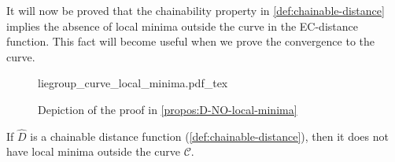 It will now be proved that the chainability property in \cref{def:chainable-distance} implies the absence of local minima outside the curve in the EC-distance function. This fact will become useful when we prove the convergence to the curve.
\begin{figure}[ht]
    \centering
    \def\svgwidth{.8\linewidth}
    {\small{liegroup_curve_local_minima.pdf_tex}}
    \caption{Depiction of the proof in \cref{propos:D-NO-local-minima}}
    \label{fig:distance-without-local-minima}
\end{figure}
\begin{proposition}\label{propos:D-NO-local-minima}
    If $\widehat{D}$ is a chainable distance function (\cref{def:chainable-distance}), then it does not have local minima outside the curve $\mathcal{C}$.
\end{proposition}
